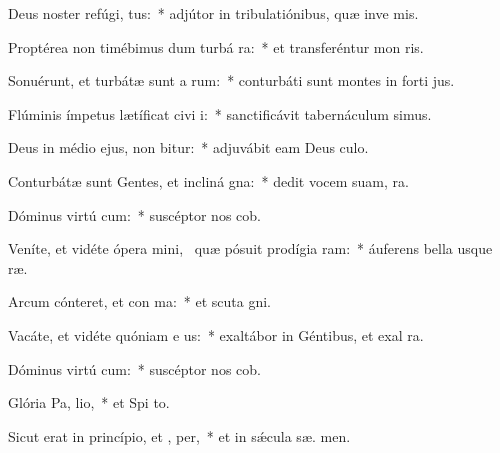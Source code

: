 \item Deus noster refúgi,  tus:~* adjútor in tribulatiónibus, quæ inve  mis.
\item Proptérea non timébimus dum turbá ra:~* et transferéntur mon   ris.
\item Sonuérunt, et turbátæ sunt a rum:~* conturbáti sunt montes in forti jus.
\item Flúminis ímpetus lætíficat civi i:~* sanctificávit tabernáculum  simus.
\item Deus in médio ejus, non bitur:~* adjuvábit eam Deus  culo.
\item Conturbátæ sunt Gentes, et incliná  gna:~* dedit vocem suam,   ra.
\item Dóminus virtú cum:~* suscéptor nos  cob.
\item Veníte, et vidéte ópera mini,~\pscross{} quæ pósuit prodígia  ram:~* áuferens bella usque   ræ.
\item Arcum cónteret, et con ma:~* et scuta  gni.
\item Vacáte, et vidéte quóniam e  us:~* exaltábor in Géntibus, et exal  ra.
\item Dóminus virtú cum:~* suscéptor nos  cob.
\item Glória Pa,  lio,~* et Spi to.
\item Sicut erat in princípio, et ,  per,~* et in sǽcula sæ. men.
